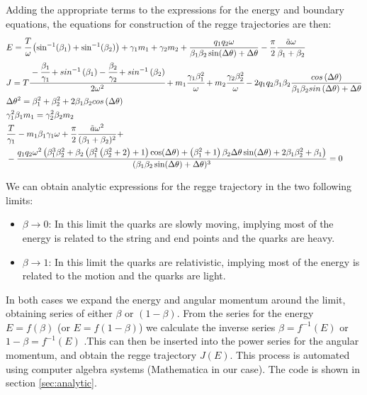 \documentclass[11pt,a4paper]{article}
\begin{document}
Adding the appropriate terms to the expressions for the energy and boundary equations, the equations for construction of the regge trajectories are then:
\begin{subequations}
\label{eq:regge}
\begin{align}
&E=\cfrac{T}{\omega}\left(\sin^{-1}(\beta_{1})+\sin^{-1}(\beta_{2})\right)+\gamma_{1}m_{1}+\gamma_{2}m_{2}+\frac{q_{1}q_{2}\omega}{\beta_{1}\beta_{2}\sin(\Delta\theta)+\Delta\theta}-\frac{\pi}{2}\frac{\tilde{a}\omega}{\beta_{1}+\beta_{2}}\\
&J=T\cfrac{-\cfrac{\beta_{1}}{\gamma_{1}}+sin^{-1}\left(\beta_{1}\right)-\cfrac{\beta_{2}}{\gamma_{2}}+sin^{-1}\left(\beta_{2}\right)}{2\omega^{2}}+m_{1}\cfrac{\gamma_{1}\beta_{1}^{2}}{\omega}+m_{2}\cfrac{\gamma_{2}\beta_{2}^{2}}{\omega}-2q_{1}q_{2}\beta_{1}\beta_{2}\frac{cos\left(\Delta\theta\right)}{\beta_{1}\beta_{2}sin\left(\Delta\theta\right)+\Delta\theta}\\
&\Delta\theta^{2}=\beta_{1}^{2}+\beta_{2}^{2}+2\beta_{1}\beta_{2}cos\left(\Delta\theta\right)\\
&\gamma_{1}^{2}\beta_{1}m_{1}=\gamma_{2}^{2}\beta_{2}m_{2}\\
&\frac{T}{\gamma_1}-m_1\beta_1\gamma_1\omega+\frac{\pi}{2}\frac{\tilde{a}\omega^2}{(\beta_1+\beta_2)^2}+\notag\\
&-\frac{q_1q_2\omega^2\left(\beta_1^3 \beta_2^2+\beta_2 \left(\beta_1^2 \left(\beta_2^2+2\right)+1\right) \cos (\Delta \theta)+\left(\beta_1^2+1\right) \beta_2 \Delta \theta  \sin (\Delta \theta )+2 \beta_1 \beta_2^2+\beta_1\right)}{(\beta_1 \beta_2 \sin (\Delta \theta )+\Delta \theta )^3}=0
\end{align}
\end{subequations}

We can obtain analytic expressions for the regge trajectory in the two following limits:
\begin{itemize}
\item $\beta\rightarrow0$: In this limit the quarks are slowly moving, implying most of the energy is related to the string and end points and the quarks are heavy.
\item $\beta\rightarrow1$: In this limit the quarks are relativistic, implying most of the energy is related to the motion and the quarks are light.

\end{itemize}
In both cases we expand the energy and angular momentum around the limit, obtaining series of either $\beta$ or $\left(1-\beta\right)$. From the series for the energy $E=f\left(\beta\right)$ (or $E=f\left(1-\beta\right)$) we calculate the inverse series $\beta=f^{-1}\left(E\right)$ or $1-\beta=f^{-1}\left(E\right)$ .This can then be inserted into the power series for the angular momentum, and obtain the regge trajectory $J\left(E\right)$. This process is automated using computer algebra systems (Mathematica in our case). The code is shown in section \ref{sec:analytic}.
\end{document}
